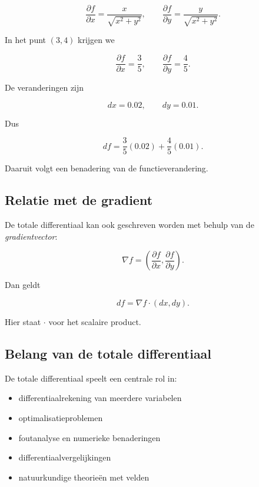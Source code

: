 \documentclass[11pt,a4paper]{article}
\begin{document}
    \[
        \frac{\partial f}{\partial x}=\frac{x}{\sqrt{x^2+y^2}},
        \qquad
        \frac{\partial f}{\partial y}=\frac{y}{\sqrt{x^2+y^2}}.
    \]

    In het punt $(3,4)$ krijgen we

    \[
        \frac{\partial f}{\partial x}=\frac{3}{5},
        \qquad
        \frac{\partial f}{\partial y}=\frac{4}{5}.
    \]

    De veranderingen zijn

    \[
        dx=0.02, \qquad dy=0.01.
    \]

    Dus

    \[
        df = \frac{3}{5}(0.02) + \frac{4}{5}(0.01).
    \]

    Daaruit volgt een benadering van de functieverandering.

    \subsection{Relatie met de gradient}

    De totale differentiaal kan ook geschreven worden met behulp van de
    \textit{gradientvector}:

    \[
        \nabla f =
        \left(
            \frac{\partial f}{\partial x},
            \frac{\partial f}{\partial y}
        \right).
    \]

    Dan geldt

    \[
        df = \nabla f \cdot (dx,dy).
    \]

    Hier staat $\cdot$ voor het scalaire product.

    \subsection{Belang van de totale differentiaal}

    De totale differentiaal speelt een centrale rol in:

    \begin{itemize}
        \item differentiaalrekening van meerdere variabelen
        \item optimalisatieproblemen
        \item foutanalyse en numerieke benaderingen
        \item differentiaalvergelijkingen
        \item natuurkundige theorieën met velden
    \end{itemize}
\end{document}
